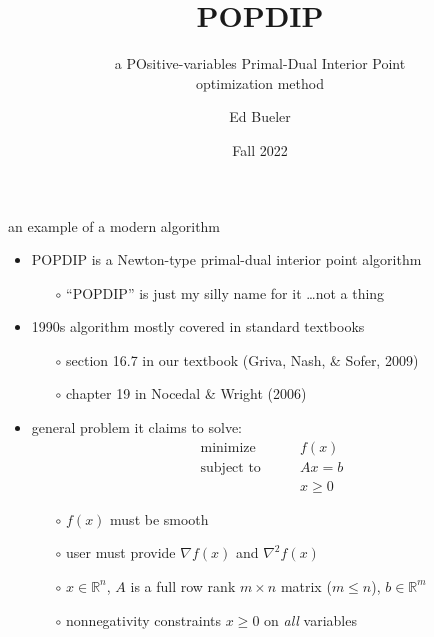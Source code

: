\documentclass[10pt,hyperref,dvipsnames]{beamer}
\title{POPDIP}
\subtitle{a POsitive-variables Primal-Dual Interior Point \\ optimization method}
\author{Ed Bueler}
\institute[MATH 661]{MATH 661 Optimization}
\date{Fall 2022}
\newcommand{\grad}{\nabla}
\newcommand{\RR}{\mathbb{R}}
\begin{document}
\beamertemplatenavigationsymbolsempty

\begin{frame}
  \maketitle
\end{frame}


\begin{frame}{an example of a modern algorithm}

\begin{itemize}
\item POPDIP is a Newton-type primal-dual interior point algorithm
    \begin{itemize}
    \item[$\circ$] ``POPDIP'' is just my silly name for it \dots not a thing
    \end{itemize}
\item 1990s algorithm mostly covered in standard textbooks
    \begin{itemize}
    \item[$\circ$] section 16.7 in our textbook (Griva, Nash, \& Sofer, 2009)
    \item[$\circ$] chapter 19 in Nocedal \& Wright (2006)
    \end{itemize}

\bigskip
\item general problem it claims to solve:
\begin{equation*}
\begin{matrix}
\text{minimize} \qquad   & f(x) \\
\text{subject to} \qquad & A x = b \\
                         & x \ge 0
\end{matrix}
\end{equation*}

    \begin{itemize}
    \item[$\circ$] $f(x)$ must be smooth
    \item[$\circ$] user must provide $\grad f(x)$ and $\grad^2 f(x)$
    \item[$\circ$] $x\in \RR^n$, $A$ is a full row rank $m\times n$ matrix ($m\le n$), $b\in\RR^m$
    \item[$\circ$] nonnegativity constraints $x\ge 0$ on \emph{all} variables
    \end{itemize}
\end{itemize}
\end{frame}
\end{document}
